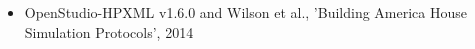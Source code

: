 \begin{itemize}
\item OpenStudio-HPXML v1.6.0 and Wilson et al., 'Building America House Simulation Protocols', 2014
\end{itemize}
